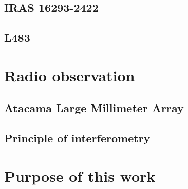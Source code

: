 \subsection{IRAS 16293-2422}
\subsection{L483}

\section{Radio observation}
\subsection{Atacama Large Millimeter Array}
\subsection{Principle of interferometry}

\section{Purpose of this work}
